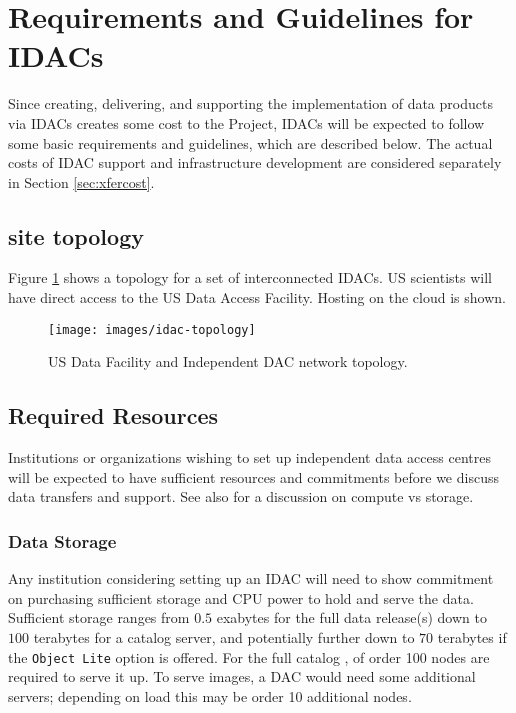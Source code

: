 \section{Requirements and Guidelines for IDACs}\label{sec:reqs}
Since creating, delivering, and supporting the implementation of \RO data products via IDACs creates some cost to the \RO Project, IDACs will be expected to follow some basic requirements and guidelines, which are described below.
The actual costs of \gls{IDAC} support and infrastructure development are considered separately in Section \ref{sec:xfercost}.

\subsection{\RO site topology} \label{sec:topology}

Figure \ref{fig:idac-topology} shows a  topology for a set of interconnected IDACs.  \gls{US} scientists will have direct access to the \RO \gls{US} Data Access Facility.  Hosting on the cloud is shown.

\begin{figure}
\begin{center}
\texttt{[image: images/idac-topology]}
\caption{US Data Facility and Independent \gls{DAC} network topology.  \label{fig:idac-topology}}
\end{center}
\end{figure}

\subsection{Required Resources} \label{sec:resources}
Institutions or organizations wishing to set up independent data access centres will be expected to have
sufficient resources and commitments before we discuss data transfers and support.
See also  for a discussion on compute vs storage.

\subsubsection{Data Storage}
Any institution considering setting up an \gls{IDAC} will need to show commitment on purchasing sufficient storage and \gls{CPU} power to hold and serve the data. Sufficient storage ranges from $0.5$ exabytes for the full data release(s) down to $100$ terabytes for a catalog server, and potentially further down to $70$ terabytes if the {\tt Object Lite} option is offered. For the full catalog , of order 100 nodes are required to serve it up. To serve images, a \gls{DAC} would need some additional servers; depending on load this may be order 10 additional nodes.

